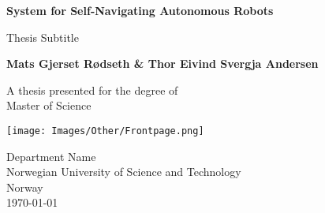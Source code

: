 \begin{titlepage}
    \begin{center}
        \vspace*{1cm}
        
        \Huge
        \textbf{System for Self-Navigating Autonomous Robots}
        
        \vspace{0.5cm}
        \LARGE
        Thesis Subtitle
        
        \vspace{1.5cm}
        
        \textbf{Mats Gjerset Rødseth \& Thor Eivind Svergja Andersen}
        
        \vfill
        
        A thesis presented for the degree of\\
        Master of Science
        
        \vspace{0.8cm}
        
        \texttt{[image: Images/Other/Frontpage.png]}
        
        \Large
        Department Name\\
        Norwegian University of Science and Technology\\
        Norway\\
        \today
        
    \end{center}
\end{titlepage}